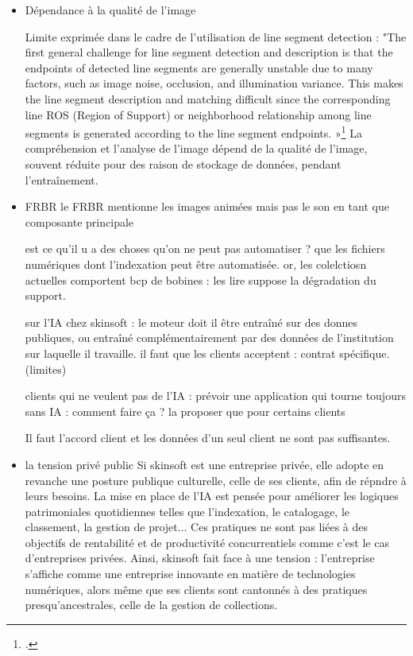 \begin{itemize}
La machine analyse différemment de l'humain, de manière objective et précise et exhaustive, qu'apporte l'humain ? : "the computational analysis of paintings has several advantages compared to an analysis carried out by human experts. For example, a computational analysis can pick up very subtle relationships that may escape the attention by human observers; moreover, computational methods are objective in nature and are potentially non-exhaustive in the amount of detail analyzed. »\footcite{brachmann2017}

\item Dépendance à la qualité de l'image

Limite exprimée dans le cadre de l'utilisation de line segment detection : 
"The first general challenge for line segment detection and description is that the endpoints of detected line segments are generally unstable due to many factors, such as image noise, occlusion, and illumination variance. This makes the line segment description and matching difficult since the corresponding line ROS (Region of Support) or neighborhood relationship among line segments is generated according to the line segment endpoints. »\footcite{lin2024}
La compréhension et l'analyse de l'image dépend de la qualité de l'image, souvent réduite pour des raison de stockage de données, pendant l'entraînement. 

\item FRBR
le FRBR mentionne les images animées
mais pas le son en tant que composante principale


est ce qu'il u a des choses qu'on ne peut pas automatiser ? que les fichiers numériques dont l'indexation peut être automatisée. or, les colelctiosn actuelles comportent bcp de bobines : les lire suppose la dégradation du support. 

sur l'IA chez skinsoft : 
le moteur doit il être entraîné sur des donnes publiques, ou entraîné complémentairement par des données de l'institution sur laquelle il travaille. il faut que les clients acceptent : contrat spécifique. (limites) 

clients qui ne veulent pas de l'IA : prévoir une application qui tourne toujours sans IA : comment faire ça ? la proposer que pour certains clients 

Il faut l'accord client et les données d'un seul client ne sont pas suffisantes.

\item la tension privé public
Si skinsoft est une entreprise privée, elle adopte en revanche une posture publique culturelle, celle de ses clients, afin de répndre à leurs besoins. La mise en place de l'IA est pensée pour améliorer les logiques patrimoniales quotidiennes telles que l'indexation, le catalogage, le classement, la gestion de projet... Ces pratiques ne sont pas liées à des objectifs de rentabilité et de productivité concurrentiels comme c'est le cas d'entreprises privées. Ainsi, skinsoft fait face à une tension : l'entreprise s'affiche comme une entreprise innovante en matière de technologies numériques, alors même que ses clients sont cantonnés à des pratiques presqu'ancestrales, celle de la gestion de collections. 


\end{itemize}

